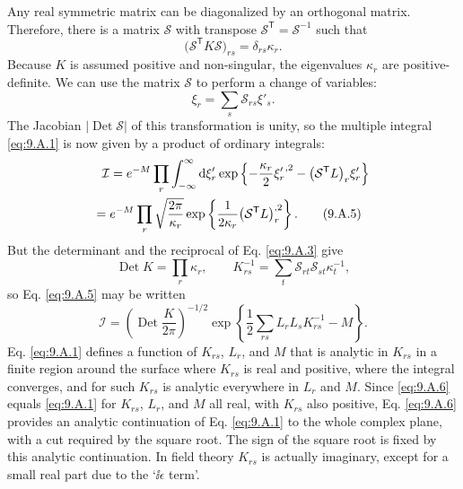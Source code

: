 Any real symmetric matrix can be diagonalized by an orthogonal matrix.
Therefore, there is a matrix $\mathcal{S}$ with transpose
$\mathcal{S}^{\mathsf T}=\mathcal{S}^{-1}$ such that
\begin{equation}
  \bigl(\mathcal{S}^{\mathsf T}K\mathcal{S}\bigr)_{rs}
  =\delta_{rs}\kappa_r.
  \tag{9.A.3}\label{eq:9.A.3}
\end{equation}
Because $K$ is assumed positive and non-singular, the eigenvalues $\kappa_r$
are positive-definite. We can use the matrix $\mathcal{S}$ to perform a
change of variables:
\begin{equation}
  \xi_r=\sum_s\mathcal{S}_{rs}\xi'_s.
  \tag{9.A.4}\label{eq:9.A.4}
\end{equation}
The Jacobian $|\operatorname{Det}\mathcal{S}|$ of this transformation is
unity, so the multiple integral \eqref{eq:9.A.1} is now given by a product of
ordinary integrals:
\begin{align}
  \mathcal{I}
  &={}e^{-M}\prod_r\int_{-\infty}^{\infty}\mathop{}\!\mathrm{d}\xi'_r
  \exp\left\{-\frac{\kappa_r}{2}{\xi'_r}^{,2}
  -\bigl(\mathcal{S}^{\mathsf T}L\bigr)_r\xi'_r\right\}
  \notag\\
  ={}&e^{-M}\prod_r\sqrt{\frac{2\pi}{\kappa_r}}
  \exp\left\{\frac{1}{2\kappa_r}
  \bigl(\mathcal{S}^{\mathsf T}L\bigr)_r^{,2}\right\}.
  \tag{9.A.5}\label{eq:9.A.5}
\end{align}
But the determinant and the reciprocal of Eq. \eqref{eq:9.A.3} give
\[
  \operatorname{Det}K=\prod_r\kappa_r,
  \qquad
  K^{-1}_{rs}=\sum_t\mathcal{S}_{rt}\mathcal{S}_{st}\kappa_t^{-1},
\]
so Eq. \eqref{eq:9.A.5} may be written
\begin{equation}
  \mathcal{I}=\left(\operatorname{Det}\frac{K}{2\pi}\right)^{-1/2}
  \exp\left\{\frac{1}{2}\sum_{rs}L_rL_sK^{-1}_{rs}-M\right\}.
  \tag{9.A.6}\label{eq:9.A.6}
\end{equation}
Eq. \eqref{eq:9.A.1} defines a function of $K_{rs}$, $L_r$, and $M$ that is analytic
in $K_{rs}$ in a finite region around the surface where $K_{rs}$ is real and
positive, where the integral converges, and for such $K_{rs}$ is analytic
everywhere in $L_r$ and $M$. Since \eqref{eq:9.A.6} equals \eqref{eq:9.A.1} for $K_{rs}$,
$L_r$, and $M$ all real, with $K_{rs}$ also positive, Eq. \eqref{eq:9.A.6} provides
an analytic continuation of Eq. \eqref{eq:9.A.1} to the whole complex plane, with a
cut required by the square root. The sign of the square root is fixed by this
analytic continuation. In field theory $K_{rs}$ is actually imaginary,
except for a small real part due to the `$\ii\epsilon$ term'.

